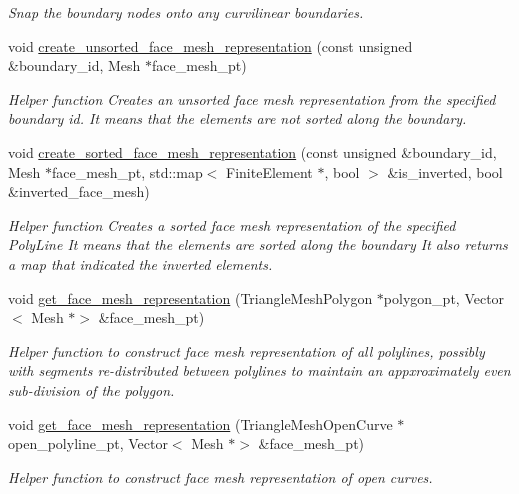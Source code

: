 \begin{DoxyCompactItemize}
\begin{DoxyCompactList}\small\item\em Snap the boundary nodes onto any curvilinear boundaries. \end{DoxyCompactList}\item 
void \hyperlink{classoomph_1_1RefineableTriangleMesh_ab1268ab0f9ea49ef262e51a0e90136b5}{create\+\_\+unsorted\+\_\+face\+\_\+mesh\+\_\+representation} (const unsigned \&boundary\+\_\+id, Mesh $\ast$face\+\_\+mesh\+\_\+pt)
\begin{DoxyCompactList}\small\item\em Helper function Creates an unsorted face mesh representation from the specified boundary id. It means that the elements are not sorted along the boundary. \end{DoxyCompactList}\item 
void \hyperlink{classoomph_1_1RefineableTriangleMesh_a8ad12ebe7625ff189c1f7beb1eabff04}{create\+\_\+sorted\+\_\+face\+\_\+mesh\+\_\+representation} (const unsigned \&boundary\+\_\+id, Mesh $\ast$face\+\_\+mesh\+\_\+pt, std\+::map$<$ Finite\+Element $\ast$, bool $>$ \&is\+\_\+inverted, bool \&inverted\+\_\+face\+\_\+mesh)
\begin{DoxyCompactList}\small\item\em Helper function Creates a sorted face mesh representation of the specified Poly\+Line It means that the elements are sorted along the boundary It also returns a map that indicated the inverted elements. \end{DoxyCompactList}\item 
void \hyperlink{classoomph_1_1RefineableTriangleMesh_a5ebb485316134f608bc89ab9854eac6c}{get\+\_\+face\+\_\+mesh\+\_\+representation} (Triangle\+Mesh\+Polygon $\ast$polygon\+\_\+pt, Vector$<$ Mesh $\ast$$>$ \&face\+\_\+mesh\+\_\+pt)
\begin{DoxyCompactList}\small\item\em Helper function to construct face mesh representation of all polylines, possibly with segments re-\/distributed between polylines to maintain an appxroximately even sub-\/division of the polygon. \end{DoxyCompactList}\item 
void \hyperlink{classoomph_1_1RefineableTriangleMesh_a8e233cfcfb0b0e5b287c347f31980786}{get\+\_\+face\+\_\+mesh\+\_\+representation} (Triangle\+Mesh\+Open\+Curve $\ast$open\+\_\+polyline\+\_\+pt, Vector$<$ Mesh $\ast$$>$ \&face\+\_\+mesh\+\_\+pt)
\begin{DoxyCompactList}\small\item\em Helper function to construct face mesh representation of open curves. \end{DoxyCompactList}\item 

\end{DoxyCompactItemize}
